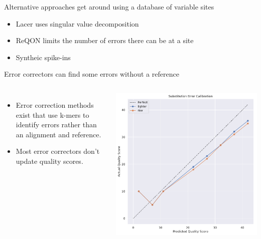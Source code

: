 \documentclass{beamer}
\begin{document}
\begin{frame}{Alternative approaches get around using a database of variable sites}
\begin{itemize}
	\item Lacer uses singular value decomposition
	\item ReQON limits the number of errors there can be at a site
	\item Syntheic spike-ins
\end{itemize}
\end{frame}

\begin{frame}{Error correctors can find some errors without a reference}
\begin{columns}
\begin{itemize}
\item Error correction methods exist that use k-mers to identify errors rather than an alignment and reference.
\item Most error correctors don't update quality scores.
\end{itemize}

\includegraphics[width=.95\linewidth]{raw_lighter.pdf}
\end{columns}
\end{frame}
\end{document}

